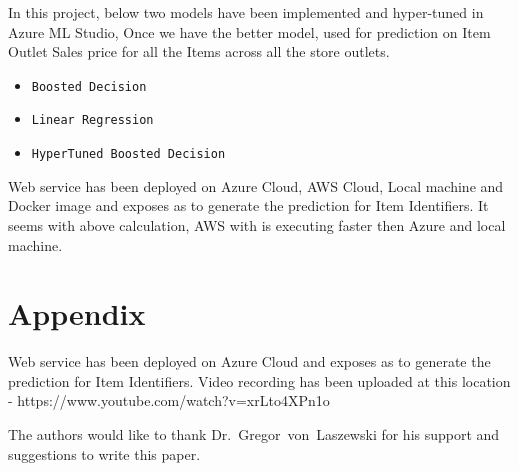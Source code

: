 In this project, below two models have been implemented and hyper-tuned in Azure ML Studio, 
Once we have the better model, used for prediction on Item Outlet Sales price for all the Items 
across all the store outlets.
\begin{itemize}
\item \verb|Boosted Decision|
\item \verb|Linear Regression|
\item \verb|HyperTuned Boosted Decision|
\end{itemize}
Web service has been deployed on Azure Cloud, AWS Cloud, Local machine and Docker image and exposes 
as to generate the prediction for Item Identifiers. It seems with above calculation, AWS with is 
executing faster then Azure and local machine.

\section{Appendix}

Web service has been deployed on Azure Cloud and exposes as to generate the prediction for Item Identifiers.
Video recording has been uploaded at this location - https://www.youtube.com/watch?v=xrLto4XPn1o


\begin{acks}

  The authors would like to thank Dr.~Gregor~von~Laszewski for his
  support and suggestions to write this paper.

\end{acks}


 
